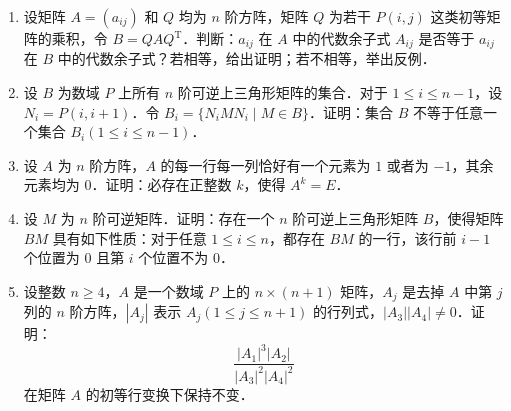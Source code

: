 \begin{enumerate}
\[\begin{pmatrix}
      a&x&a&\cdots&a\\
      a&a&x&\cdots&a\\
      \vdots&\vdots&\vdots&&\vdots\\
      a&a&a&\cdots&x
    \end{pmatrix}_{n\times n},
  \]
  于是有等式 $A(x,a,n)A(y,b,n)=A(z,c,n)$ 成立．
  \begin{enumerate}
    \item 试用 $x,y,a,b$ 表示 $z,c$；
  \anssub
    \item 判断矩阵 $A(0,1,4)$ 是否可逆，若可逆求出其逆矩阵．
  \anssub
  \end{enumerate}
  \item 设矩阵 $A=(a_{ij})$ 和 $Q$ 均为 $n$ 阶方阵，矩阵 $Q$ 为若干 $P(i,j)$ 这类初等矩阵的乘积，令 $B=QAQ^{\mathrm{T}}$．判断：$a_{ij}$ 在 $A$ 中的代数余子式 $A_{ij}$ 是否等于 $a_{ij}$ 在 $B$ 中的代数余子式？若相等，给出证明；若不相等，举出反例．
  \ansproof
  \item 设 $B$ 为数域 $P$ 上所有 $n$ 阶可逆上三角形矩阵的集合．对于 $1\leqslant i\leqslant n-1$，设 $N_i=P(i,i+1)$．令 $B_i=\{N_iMN_i\mid M\in B\}$．证明：集合 $B$ 不等于任意一个集合 $B_i(1\leqslant i\leqslant n-1)$．
  \ansproof
  \item 设 $A$ 为 $n$ 阶方阵，$A$ 的每一行每一列恰好有一个元素为 $1$ 或者为 $-1$，其余元素均为 $0$．证明：必存在正整数 $k$，使得 $A^k=E$．
  \ansproof
  \item 设 $M$ 为 $n$ 阶可逆矩阵．证明：存在一个 $n$ 阶可逆上三角形矩阵 $B$，使得矩阵 $BM$ 具有如下性质：对于任意 $1\leqslant i\leqslant n$，都存在 $BM$ 的一行，该行前 $i-1$ 个位置为 $0$ 且第 $i$ 个位置不为 $0$．
  \ansproof
  \item 设整数 $n\geqslant4$，$A$ 是一个数域 $P$ 上的 $n\times(n+1)$ 矩阵，$A_j$ 是去掉 $A$ 中第 $j$ 列的 $n$ 阶方阵，$|A_j|$ 表示 $A_j(1\leqslant j\leqslant n+1)$ 的行列式，$|A_3||A_4|\neq0$．证明：
  \[
    \frac{|A_1|^3|A_2|}{|A_3|^2|A_4|^2}
  \]
  在矩阵 $A$ 的初等行变换下保持不变．
  \ansproof
\end{enumerate}
